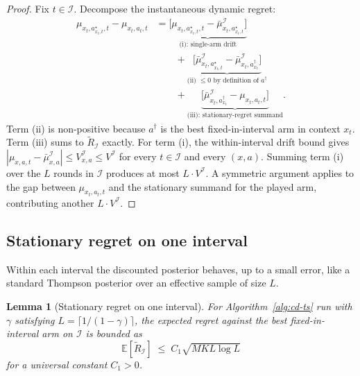\documentclass[11pt]{article}
\newtheorem{lemma}[theorem]{Lemma}
\theoremstyle{definition}
\newcommand{\E}{\mathbb{E}}
\begin{document}
\begin{proof}
Fix $t \in \mathcal{I}$. Decompose the instantaneous dynamic regret:
\begin{align*}
    \mu_{x_t, a^\star_{x_t,t}, t} - \mu_{x_t, a_t, t}
    &= \underbrace{\Big[\mu_{x_t, a^\star_{x_t,t}, t} - \bar{\mu}^{\mathcal{I}}_{x_t, a^\star_{x_t,t}}\Big]}_{\text{(i): single-arm drift}} \\
    &\qquad + \underbrace{\Big[\bar{\mu}^{\mathcal{I}}_{x_t, a^\star_{x_t,t}} - \bar{\mu}^{\mathcal{I}}_{x_t, a^\dagger_{x_t}}\Big]}_{\text{(ii) $\leq 0$ by definition of $a^\dagger$}} \\
    &\qquad + \underbrace{\Big[\bar{\mu}^{\mathcal{I}}_{x_t, a^\dagger_{x_t}} - \mu_{x_t, a_t, t}\Big]}_{\text{(iii): stationary-regret summand}}.
\end{align*}
Term (ii) is non-positive because $a^\dagger$ is the best fixed-in-interval arm in context $x_t$. Term (iii) sums to $\widetilde{R}_{\mathcal{I}}$ exactly. For term (i), the within-interval drift bound gives $|\mu_{x,a,t} - \bar{\mu}^{\mathcal{I}}_{x,a}| \leq V^{\mathcal{I}}_{x,a} \leq V^{\mathcal{I}}$ for every $t \in \mathcal{I}$ and every $(x,a)$. Summing term (i) over the $L$ rounds in $\mathcal{I}$ produces at most $L \cdot V^{\mathcal{I}}$. A symmetric argument applies to the gap between $\mu_{x_t, a_t, t}$ and the stationary summand for the played arm, contributing another $L \cdot V^{\mathcal{I}}$.
\end{proof}

\subsection{Stationary regret on one interval}

Within each interval the discounted posterior behaves, up to a small error, like a standard Thompson posterior over an effective sample of size $L$.

\begin{lemma}[Stationary regret on one interval]
\label{lem:stationary-interval}
For Algorithm~\ref{alg:cd-ts} run with $\gamma$ satisfying $L = \lceil 1/(1-\gamma) \rceil$, the expected regret against the best fixed-in-interval arm on $\mathcal{I}$ is bounded as
\[
    \E[\widetilde{R}_{\mathcal{I}}] \;\leq\; C_1 \sqrt{M K L \log L}
\]
for a universal constant $C_1 > 0$.
\end{lemma}
\end{document}
